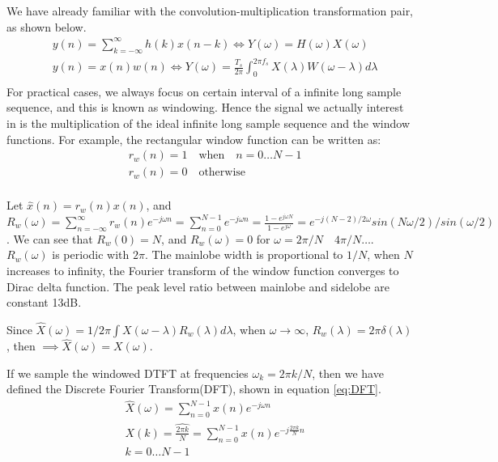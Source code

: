 We have already familiar with the convolution-multiplication transformation pair, as shown below.
\begin{equation}
  \label{eq:pair}
  \begin{aligned}
    & y(n) = \sum_{k=-\infty}^{\infty}h(k)x(n-k) \iff Y(\omega) = H(\omega)X(\omega)\\
    & y(n) = x(n)w(n) \iff Y(\omega) = \frac{T_s}{2\pi}\int_{0}^{2\pi f_s}X(\lambda)W(\omega-\lambda)d\lambda\\
  \end{aligned}
\end{equation}
For practical cases, we always focus on certain interval of a infinite long sample sequence, 
and this is known as windowing. Hence the signal we actually interest in is the multiplication
of the ideal infinite long sample sequence and the window functions. For example, the
rectangular window function can be written as:
\begin{equation}
  \label{eq:rectan}
  \begin{aligned}
&    r_w(n) = 1 \quad \text{when} \quad n = 0 \dots N-1 \\
&    r_w(n) = 0 \quad \text{otherwise}\\
  \end{aligned}
\end{equation}

Let $\hat{x}(n) = r_w(n)x(n)$, and $R_w(\omega)=\sum_{n=-\infty}^{\infty}r_w(n)e^{-j\omega n}
=\sum_{n=0}^{N-1}e^{-j\omega n}=\frac{1-e^{j\omega N}}{1-e^{j\omega}}
=e^{-j(N-2)/2\omega}sin(N\omega /2)/sin(\omega /2)$. We can see that 
$R_w(0) = N$, and $R_w(\omega)=0$ for $\omega = 2\pi/N \quad 4\pi/N \dots $. 
$R_w(\omega)$ is periodic with $2\pi$. The mainlobe width is proportional to 
$1/N$, when $N$ increases to infinity, the Fourier transform of the window 
function converges to Dirac delta function. The peak level ratio between 
mainlobe and sidelobe are constant 13dB. 

Since $\hat{X}(\omega) = 1/2\pi\int X(\omega-\lambda)R_w(\lambda)d\lambda$,
when $\omega \rightarrow \infty$, $R_w(\lambda) = 2\pi\delta(\lambda)$, 
then $\implies \hat{X}(\omega) = X(\omega)$.

If we sample the windowed DTFT at frequencies $\omega_k=2\pi k/N$, 
then we have defined the Discrete Fourier Transform(DFT), shown in equation \ref{eq:DFT}.
\begin{equation}
  \label{eq:DFT}
  \begin{aligned}
    & \hat{X}(\omega)=\sum_{n=0}^{N-1}x(n)e^{-j\omega n} \\
    & X(k) = \hat{\frac{2\pi k}{N}} = \sum_{n=0}^{N-1}x(n)e^{-j\frac{2\pi k}{N}n}\\
    & k = 0 \dots N-1 \\
  \end{aligned}
\end{equation}

